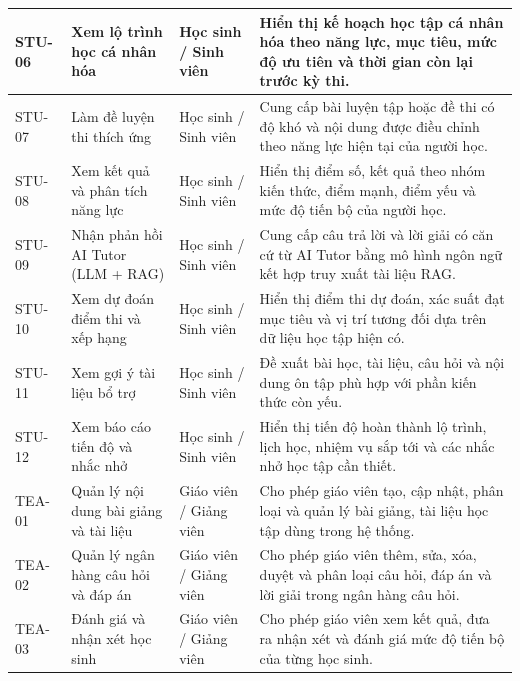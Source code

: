 \begin{longtable}{|p{}|p{}|p{}|p{}|}
STU-06 &
Xem lộ trình học cá nhân hóa &
Học sinh / Sinh viên &
Hiển thị kế hoạch học tập cá nhân hóa theo năng lực, mục tiêu, mức độ ưu tiên và thời gian còn lại trước kỳ thi. \\
\hline

STU-07 &
Làm đề luyện thi thích ứng &
Học sinh / Sinh viên &
Cung cấp bài luyện tập hoặc đề thi có độ khó và nội dung được điều chỉnh theo năng lực hiện tại của người học. \\
\hline

STU-08 &
Xem kết quả và phân tích năng lực &
Học sinh / Sinh viên &
Hiển thị điểm số, kết quả theo nhóm kiến thức, điểm mạnh, điểm yếu và mức độ tiến bộ của người học. \\
\hline

STU-09 &
Nhận phản hồi AI Tutor (LLM + RAG) &
Học sinh / Sinh viên &
Cung cấp câu trả lời và lời giải có căn cứ từ AI Tutor bằng mô hình ngôn ngữ kết hợp truy xuất tài liệu RAG. \\
\hline

STU-10 &
Xem dự đoán điểm thi và xếp hạng &
Học sinh / Sinh viên &
Hiển thị điểm thi dự đoán, xác suất đạt mục tiêu và vị trí tương đối dựa trên dữ liệu học tập hiện có. \\
\hline

STU-11 &
Xem gợi ý tài liệu bổ trợ &
Học sinh / Sinh viên &
Đề xuất bài học, tài liệu, câu hỏi và nội dung ôn tập phù hợp với phần kiến thức còn yếu. \\
\hline

STU-12 &
Xem báo cáo tiến độ và nhắc nhở &
Học sinh / Sinh viên &
Hiển thị tiến độ hoàn thành lộ trình, lịch học, nhiệm vụ sắp tới và các nhắc nhở học tập cần thiết. \\
\hline

TEA-01 &
Quản lý nội dung bài giảng và tài liệu &
Giáo viên / Giảng viên &
Cho phép giáo viên tạo, cập nhật, phân loại và quản lý bài giảng, tài liệu học tập dùng trong hệ thống. \\
\hline

TEA-02 &
Quản lý ngân hàng câu hỏi và đáp án &
Giáo viên / Giảng viên &
Cho phép giáo viên thêm, sửa, xóa, duyệt và phân loại câu hỏi, đáp án và lời giải trong ngân hàng câu hỏi. \\
\hline

TEA-03 &
Đánh giá và nhận xét học sinh &
Giáo viên / Giảng viên &
Cho phép giáo viên xem kết quả, đưa ra nhận xét và đánh giá mức độ tiến bộ của từng học sinh. \\
\hline


\end{longtable}
